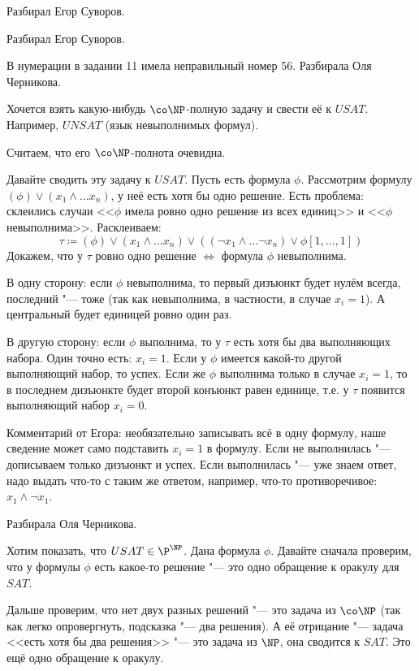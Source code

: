 	Разбирал Егор Суворов.
	\TODO

	Разбирал Егор Суворов.
	\TODO

	В нумерации в задании 11 имела неправильный номер 56.
	Разбирала Оля Черникова.

	Хочется взять какую-нибудь $\co\NP$-полную задачу и свести её к $USAT$.
	Например, $UNSAT$ (язык невыполнимых формул).
	\begin{Rem}
		Считаем, что его $\co\NP$-полнота очевидна.
		\TODO
	\end{Rem}
	Давайте сводить эту задачу к $USAT$.
	Пусть есть формула $\phi$.
	Рассмотрим формулу $(\phi) \lor (x_1 \land \dots x_n)$, у неё есть хотя бы одно решение.
	Есть проблема: склеились случаи <<$\phi$ имела ровно одно решение из всех единиц>> и <<$\phi$ невыполнима>>.
	Расклеиваем:
	\[
		\tau \coloneq (\phi) \lor (x_1 \land \dots x_n) \lor ((\lnot x_1 \land \dots \lnot x_n) \lor \phi[1, \dots, 1])
	\]
	Докажем, что у $\tau$ ровно одно решение $\iff$ формула $\phi$ невыполнима.

	В одну сторону: если $\phi$ невыполнима, то первый дизъюнкт будет нулём всегда, последний "--- тоже (так как невыполнима, в частности, в случае $x_i=1$).
	А центральный будет единицей ровно один раз.

	В другую сторону: если $\phi$ выполнима, то у $\tau$ есть хотя бы два выполняющих набора.
	Один точно есть: $x_i=1$.
	Если у $\phi$ имеется какой-то другой выполняющий набор, то успех.
	Если же $\phi$ выполнима только в случае $x_i=1$, то в последнем дизъюнкте будет второй конъюнкт равен единице,
	т.е. у $\tau$ появится выполняющий набор $x_i=0$.

	\begin{Rem}
		Комментарий от Егора: необязательно записывать всё в одну формулу, наше сведение может само подставить $x_i=1$ в формулу.
		Если не выполнилась "--- дописываем только дизъюнкт и успех.
		Если выполнилась "--- уже знаем ответ, надо выдать что-то с таким же ответом, например, что-то противоречивое: $x_1 \land \lnot x_1$.
	\end{Rem}

	Разбирала Оля Черникова.

	Хотим показать, что $USAT \in \P^{\NP}$.
	Дана формула $\phi$.
	Давайте сначала проверим, что у формулы $\phi$ есть какое-то решение "--- это одно обращение к оракулу для $SAT$.

	Дальше проверим, что нет двух разных решений "--- это задача из $\co\NP$ (так как легко опровергнуть, подсказка "--- два решения).
	А её отрицание "--- задача <<есть хотя бы два решения>> "--- это задача из $\NP$, она сводится к $SAT$.
	Это ещё одно обращение к оракулу.
